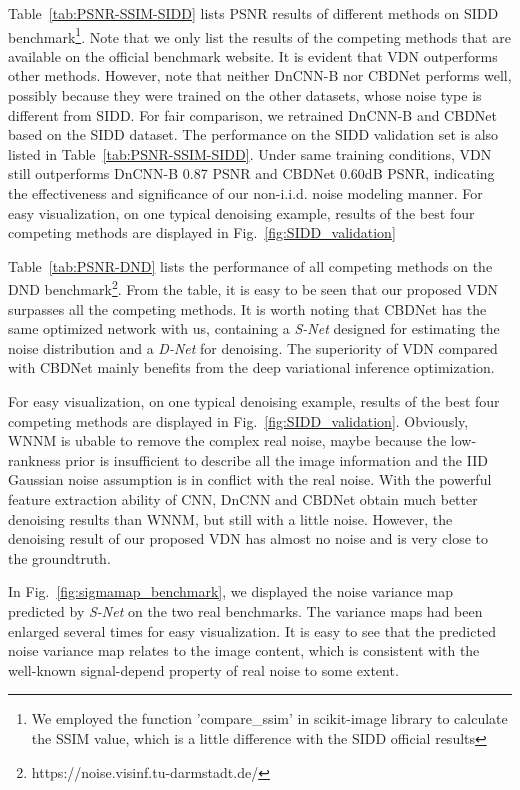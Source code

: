 \documentclass{article}
\begin{document}
Table~\ref{tab:PSNR-SSIM-SIDD} lists PSNR results of different methods on
SIDD benchmark\footnote{We employed the function 'compare\_ssim' in scikit-image library to calculate
the SSIM value, which is a little difference with the SIDD official results}.
Note that we only list the results of the competing methods that are available
on the official benchmark website.
It is evident that VDN outperforms other methods.
However, note that neither DnCNN-B nor CBDNet performs well, possibly because they were trained
on the other datasets, whose noise type is different from SIDD. For fair comparison, we retrained DnCNN-B and CBDNet
based on the SIDD dataset. The performance on the SIDD validation
set is also listed in Table~\ref{tab:PSNR-SSIM-SIDD}. Under same training conditions, VDN still outperforms DnCNN-B 0.87 PSNR
and CBDNet 0.60dB PSNR, indicating the effectiveness and significance of our non-i.i.d. noise modeling manner.
For easy visualization, on one typical denoising example, results of the best four competing methods are displayed
in Fig.~\ref{fig:SIDD_validation}

Table~\ref{tab:PSNR-DND} lists the performance of all competing methods
on the DND benchmark\footnote{https://noise.visinf.tu-darmstadt.de/}.
From the table, it is easy to be seen that our proposed VDN surpasses all the competing methods.
It is worth noting that CBDNet has the same optimized network with us, containing a \textit{S-Net} designed
for estimating the noise distribution and a \textit{D-Net} for denoising. The superiority of VDN compared
with CBDNet mainly benefits from the deep variational inference optimization.

For easy visualization, on one typical denoising example, results of the best four competing methods are displayed
in Fig.~\ref{fig:SIDD_validation}. Obviously, WNNM is ubable to remove the complex real noise, maybe because
the low-rankness prior is insufficient to describe all the image information and the IID Gaussian noise
assumption is in conflict with the real noise. With the powerful feature extraction ability of CNN, DnCNN and
CBDNet obtain much better denoising results than WNNM, but still with a little noise.
However, the denoising result of 
our proposed VDN has almost no noise and is very close to the groundtruth.

In Fig.~\ref{fig:sigmamap_benchmark}, we displayed the noise variance map predicted by \textit{S-Net} on the two real
benchmarks. The variance maps had been enlarged several times for easy visualization. It is easy to see that the
predicted noise variance map relates to the image content,
which is consistent with the well-known signal-depend
property of real noise to some extent.
\end{document}
